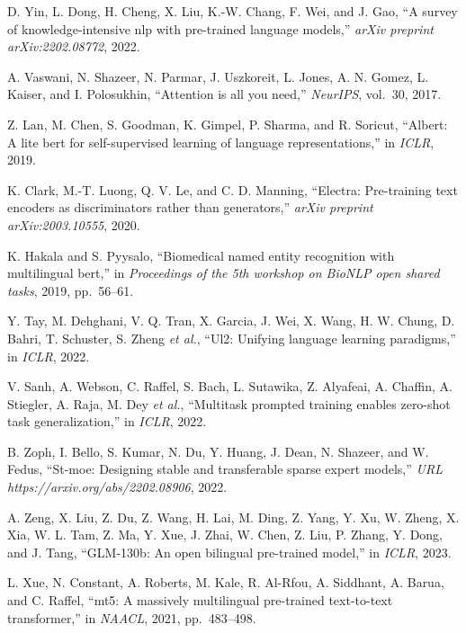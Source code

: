 \begin{enumerate}[leftmargin=2em,label={[\arabic*]}]
\item D. Yin, L. Dong, H. Cheng, X. Liu, K.-W. Chang, F. Wei, and J. Gao, ``A survey of knowledge-intensive nlp with pre-trained language models,'' \textit{arXiv preprint arXiv:2202.08772}, 2022.

\item A. Vaswani, N. Shazeer, N. Parmar, J. Uszkoreit, L. Jones, A. N. Gomez, L. Kaiser, and I. Polosukhin, ``Attention is all you need,'' \textit{NeurIPS}, vol.~30, 2017.

\item Z. Lan, M. Chen, S. Goodman, K. Gimpel, P. Sharma, and R. Soricut, ``Albert: A lite bert for self-supervised learning of language representations,'' in \textit{ICLR}, 2019.

\item K. Clark, M.-T. Luong, Q. V. Le, and C. D. Manning, ``Electra: Pre-training text encoders as discriminators rather than generators,'' \textit{arXiv preprint arXiv:2003.10555}, 2020.

\item K. Hakala and S. Pyysalo, ``Biomedical named entity recognition with multilingual bert,'' in \textit{Proceedings of the 5th workshop on BioNLP open shared tasks}, 2019, pp.~56--61.

\item Y. Tay, M. Dehghani, V. Q. Tran, X. Garcia, J. Wei, X. Wang, H. W. Chung, D. Bahri, T. Schuster, S. Zheng \textit{et al.}, ``Ul2: Unifying language learning paradigms,'' in \textit{ICLR}, 2022.

\item V. Sanh, A. Webson, C. Raffel, S. Bach, L. Sutawika, Z. Alyafeai, A. Chaffin, A. Stiegler, A. Raja, M. Dey \textit{et al.}, ``Multitask prompted training enables zero-shot task generalization,'' in \textit{ICLR}, 2022.

\item B. Zoph, I. Bello, S. Kumar, N. Du, Y. Huang, J. Dean, N. Shazeer, and W. Fedus, ``St-moe: Designing stable and transferable sparse expert models,'' \textit{URL https://arxiv.org/abs/2202.08906}, 2022.

\item A. Zeng, X. Liu, Z. Du, Z. Wang, H. Lai, M. Ding, Z. Yang, Y. Xu, W. Zheng, X. Xia, W. L. Tam, Z. Ma, Y. Xue, J. Zhai, W. Chen, Z. Liu, P. Zhang, Y. Dong, and J. Tang, ``GLM-130b: An open bilingual pre-trained model,'' in \textit{ICLR}, 2023.

\item L. Xue, N. Constant, A. Roberts, M. Kale, R. Al-Rfou, A. Siddhant, A. Barua, and C. Raffel, ``mt5: A massively multilingual pre-trained text-to-text transformer,'' in \textit{NAACL}, 2021, pp.~483--498.


\end{enumerate}
